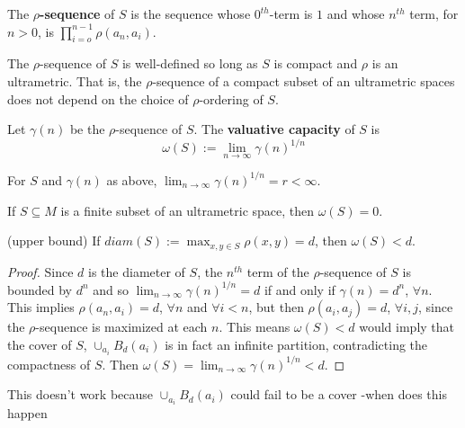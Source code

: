 \begin{definition*}
	\cite{kj} The \textbf{$\rho$-sequence} of $S$ is the sequence whose $0^{th}$-term is $1$ and whose $n^{th}$ term, for $n >0$, is $\prod_{i=o}^{n-1} \rho(a_n,a_i)$.
\end{definition*}

\begin{proposition*}
	\cite{kj} The $\rho$-sequence of $S$ is well-defined so long as $S$ is compact and $\rho$ is an ultrametric. That is, the $\rho$-sequence of a compact subset of an ultrametric spaces does not depend on the choice of $\rho$-ordering of $S$.
\end{proposition*}

\begin{definition*}
	\cite{kj}  Let $\gamma(n)$ be the $\rho$-sequence of $S$. The \textbf{valuative capacity} of $S$ is \[\omega(S)
	:= \lim_{n\to\infty} \gamma(n)^{1/n}\]  
\end{definition*}


\begin{proposition*}
	\cite{kj} For $S$ and $\gamma(n)$ as above,  $\lim_{n\to\infty} \gamma(n)^{1/n} = r < \infty$. 
\end{proposition*}


\begin{proposition*}
	If $S \subseteq M$ is a finite subset of an ultrametric space, then $\omega(S) =0$.
\end{proposition*}


\begin{proposition*}
	(upper bound) If $diam(S)  := \max_{x,y \in S} \rho(x,y)= d$, then $\omega(S) < d$.
\end{proposition*}

\begin{proof}
	Since $d$ is the diameter of $S$, the $n^{th}$ term of the $\rho$-sequence of $S$ is bounded by $d^n$ and so $ \lim_{n\to\infty} \gamma(n)^{1/n}=d$ if and only if $\gamma(n)=d^n$, $\forall n$. This implies $\rho(a_n, a_i) = d$, $\forall n$ and $\forall i < n$, but then $\rho(a_i,a_j)=d$, $\forall i,j$, since the $\rho$-sequence is maximized at each $n$. This means $\omega(S) < d$ would imply that the cover of $S$, $\cup_{a_i} B_d(a_i)$ is in fact an infinite partition, contradicting the compactness of $S$. Then  $\omega(S)= \lim_{n\to\infty} \gamma(n)^{1/n}<d$. 
\end{proof}

This doesn't work because  $\cup_{a_i} B_d(a_i)$  could fail to be a cover -when does this happen



